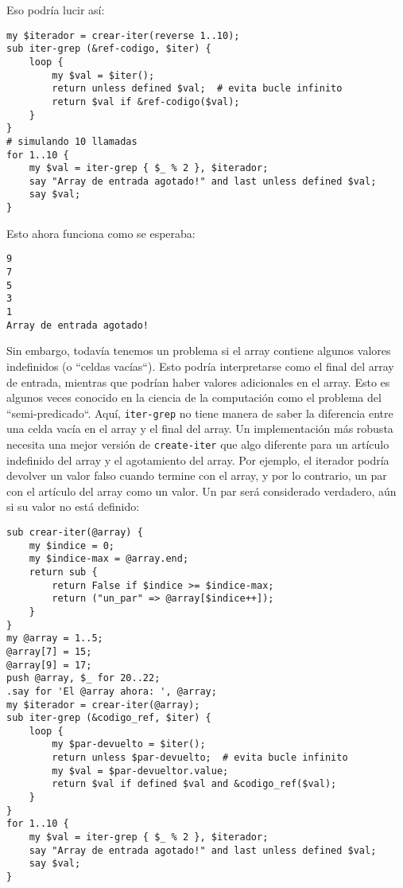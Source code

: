 Eso podría lucir así:

\begin{verbatim}
my $iterador = crear-iter(reverse 1..10);
sub iter-grep (&ref-codigo, $iter) {
    loop {
        my $val = $iter();
        return unless defined $val;  # evita bucle infinito
        return $val if &ref-codigo($val);
	}
}
# simulando 10 llamadas
for 1..10 {
    my $val = iter-grep { $_ % 2 }, $iterador;
    say "Array de entrada agotado!" and last unless defined $val;
    say $val;
}
\end{verbatim}

Esto ahora funciona como se esperaba:

\begin{verbatim}
9
7
5
3
1
Array de entrada agotado!
\end{verbatim}

Sin embargo, todavía tenemos un problema si el array
contiene algunos valores indefinidos (o ``celdas vacías``). 
Esto podría interpretarse como el final del array de entrada,
mientras que podrían haber valores adicionales en el array.
Esto es algunos veces conocido en la ciencia de la computación
como el problema del ``semi-predicado``. Aquí, {\tt iter-grep} no
tiene manera de saber la diferencia entre una celda vacía en el
array y el final del array. Un implementación más robusta necesita
una mejor versión de {\tt create-iter}  que algo diferente para un 
artículo indefinido del array y el agotamiento del array. Por ejemplo, 
el iterador podría devolver un valor falso cuando termine con el array,
y por lo contrario, un par con el artículo del array como un valor. Un 
par será considerado verdadero, aún si su valor no está definido:

\begin{verbatim}
sub crear-iter(@array) {
    my $indice = 0;
    my $indice-max = @array.end;
    return sub { 
        return False if $indice >= $indice-max; 
        return ("un_par" => @array[$indice++]);
    }
}
my @array = 1..5;
@array[7] = 15;
@array[9] = 17;
push @array, $_ for 20..22;
.say for 'El @array ahora: ', @array;
my $iterador = crear-iter(@array);
sub iter-grep (&codigo_ref, $iter) {
    loop {
        my $par-devuelto = $iter();
        return unless $par-devuelto;  # evita bucle infinito
        my $val = $par-devueltor.value;
        return $val if defined $val and &codigo_ref($val);
	}
}
for 1..10 {
    my $val = iter-grep { $_ % 2 }, $iterador;
    say "Array de entrada agotado!" and last unless defined $val;
    say $val;
}
\end{verbatim}

